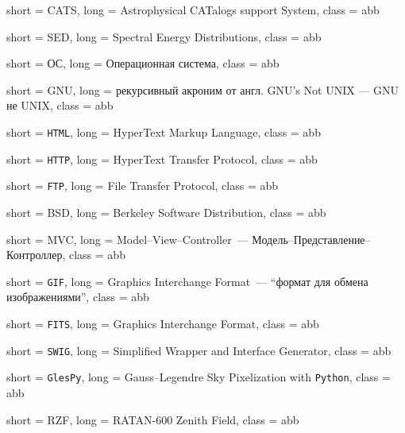  {
    short = CATS,
    long = Astrophysical CATalogs support System,
    class = abb
}

 {
    short = SED,
    long = Spectral Energy Distributions,
    class = abb
}

 {
    short = ОС,
    long = Операционная система,
    class = abb
}

 {
    short = GNU,
    long =  {рекурсивный акроним от англ. GNU's Not UNIX --- GNU не UNIX},
    class = abb
}
\providecommand{\gnu}{\acs{gnu}\xspace}

 {
    short = \texttt{HTML},
    long = HyperText Markup Language,
    class = abb
}

 {
    short = \texttt{HTTP},
    long = HyperText Transfer Protocol,
    class = abb
}

 {
    short = \texttt{FTP},
    long = File Transfer Protocol,
    class = abb
}

 {
    short = BSD,
    long = Berkeley Software Distribution,
    class = abb
}

 {
    short = MVC,
    long = {Model--View--Controller~--- Модель--Представление--Контроллер},
    class = abb
}

 {
    short = \texttt{GIF},
    long = Graphics Interchange Format~--- ``формат для обмена изображениями'',
    class = abb
}

 {
    short = \texttt{FITS},
    long = Graphics Interchange Format,
    class = abb
}

 {
    short = \texttt{SWIG},
    long = Simplified Wrapper and Interface Generator,
    class = abb
}

 {
    short = \texttt{GlesPy},
    long = {Gauss--Legendre Sky Pixelization with \texttt{Python}},
    class = abb
}
\providecommand{\glespy}{\acs{glespy}\xspace}

 {
    short = RZF,
    long = RATAN-600 Zenith Field,
    class = abb
}

